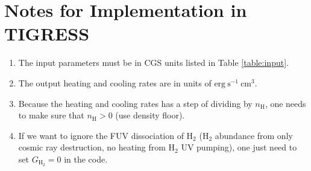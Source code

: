 \documentclass[iop,numberedappendix]{emulateapj}
\newcommand{\mr}{\mathrm}
\newcommand{\Ht}{\mathrm{H_2}}
\newcommand{\Ho}{\mathrm{H}}
\begin{document}
\section{Notes for Implementation in TIGRESS}\label{section:notes}
\begin{enumerate}
    \item The input parameters must be in CGS units listed in Table
        \ref{table:input}.
    \item The output heating and cooling rates are in units of
        $\mr{erg~s^{-1}~cm^{3}}$.
    \item Because the heating and cooling rates has a step of dividing by
        $n_\Ho$, one needs to make sure that $n_\Ho > 0$ (use density floor). 
    \item If we want to ignore the FUV dissociation of $\Ht$ ($\Ht$ abundance
        from only cosmic ray destruction, no heating from $\Ht$ UV pumping),
        one just need to set $G_\Ht=0$ in the code.
\end{enumerate}




\end{document}
